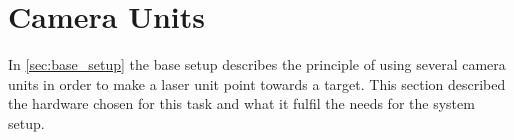 \section{Camera Units}
\label{s:cu}
In \cref{sec:base_setup} the base setup describes the principle of using several camera units in order to make a laser unit point towards a target. This section described the hardware chosen for this task and what it fulfil the needs for the system setup.

